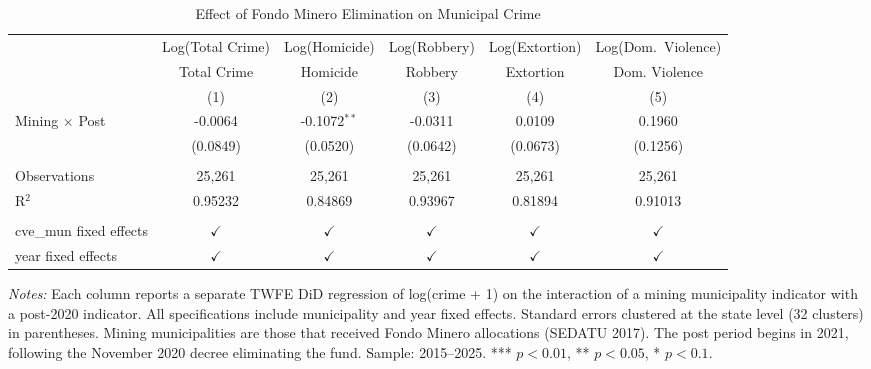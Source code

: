 
\begin{table}[htbp]
   \caption{\label{tab:main_did} Effect of Fondo Minero Elimination on Municipal Crime}
   \bigskip
   \centering
   \begin{adjustbox}{max width=\textwidth}
   \begin{tabular}{lccccc}
      \toprule
                              & Log(Total Crime) & Log(Homicide)  & Log(Robbery)  & Log(Extortion) & Log(Dom.\ Violence)\\   
                              & Total Crime      & Homicide       & Robbery       & Extortion      & Dom. Violence \\   
                              & (1)              & (2)            & (3)           & (4)            & (5)\\  
      \midrule 
      Mining $\times$ Post    & -0.0064          & -0.1072$^{**}$ & -0.0311       & 0.0109         & 0.1960\\   
                              & (0.0849)         & (0.0520)       & (0.0642)      & (0.0673)       & (0.1256)\\   
       \\
      Observations            & 25,261           & 25,261         & 25,261        & 25,261         & 25,261\\  
      R$^2$                   & 0.95232          & 0.84869        & 0.93967       & 0.81894        & 0.91013\\  
       \\
      cve\_mun fixed effects  & $\checkmark$     & $\checkmark$   & $\checkmark$  & $\checkmark$   & $\checkmark$\\   
      year fixed effects      & $\checkmark$     & $\checkmark$   & $\checkmark$  & $\checkmark$   & $\checkmark$\\   
      \bottomrule
   \end{tabular}
   \end{adjustbox}

   \par \raggedright
   \textit{Notes:} Each column reports a separate TWFE DiD regression of log(crime + 1) on the interaction of a mining municipality indicator with a post-2020 indicator. All specifications include municipality and year fixed effects. Standard errors clustered at the state level (32 clusters) in parentheses. Mining municipalities are those that received Fondo Minero allocations (SEDATU 2017). The post period begins in 2021, following the November 2020 decree eliminating the fund. Sample: 2015--2025. *** $p<0.01$, ** $p<0.05$, * $p<0.1$.
\end{table}


